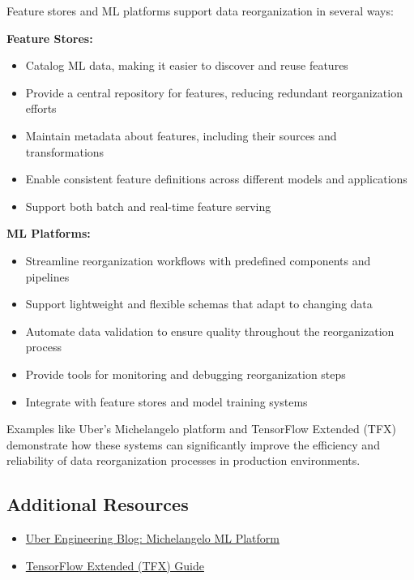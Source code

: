 \documentclass[12pt]{article}
\begin{document}
\begin{enumerate}
    \begin{tcolorbox}[colback=blue!5!white,colframe=blue!75!black,title={Solution}]
    Feature stores and ML platforms support data reorganization in several ways:
    
    \textbf{Feature Stores:}
    \begin{itemize}
        \item Catalog ML data, making it easier to discover and reuse features
        \item Provide a central repository for features, reducing redundant reorganization efforts
        \item Maintain metadata about features, including their sources and transformations
        \item Enable consistent feature definitions across different models and applications
        \item Support both batch and real-time feature serving
    \end{itemize}
    
    \textbf{ML Platforms:}
    \begin{itemize}
        \item Streamline reorganization workflows with predefined components and pipelines
        \item Support lightweight and flexible schemas that adapt to changing data
        \item Automate data validation to ensure quality throughout the reorganization process
        \item Provide tools for monitoring and debugging reorganization steps
        \item Integrate with feature stores and model training systems
    \end{itemize}
    
    Examples like Uber's Michelangelo platform and TensorFlow Extended (TFX) demonstrate how these systems can significantly improve the efficiency and reliability of data reorganization processes in production environments.
    \end{tcolorbox}
\end{enumerate}

\subsection{Additional Resources}

\begin{itemize}
    \item \href{https://eng.uber.com/michelangelo/}{Uber Engineering Blog: Michelangelo ML Platform}
    \item \href{https://www.tensorflow.org/tfx/guide}{TensorFlow Extended (TFX) Guide}
\end{itemize}
\end{document}
